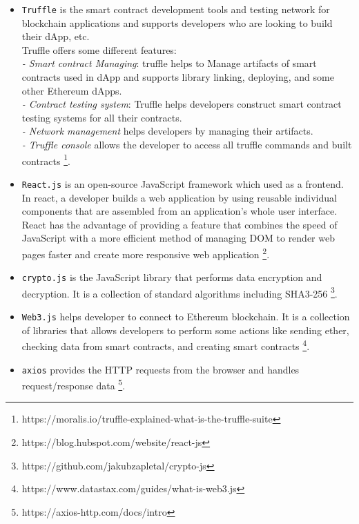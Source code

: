 \begin{itemize}
  \item \texttt{Truffle} is the smart contract development tools and testing network for blockchain applications and supports developers who are looking to build their dApp, etc. \\
 Truffle offers some different features: \\
 \textit{- Smart contract Managing}: truffle helps to Manage artifacts of smart contracts used in dApp and supports library linking, deploying, and some other Ethereum dApps. \\
 \hspace{3cm} \textit{- Contract testing system}: Truffle helps developers construct smart contract testing systems for all their contracts. \\
 \textit{- Network management} helps developers by managing their artifacts. \\
 \textit{- Truffle console} allows the developer to access all truffle commands and built contracts \footnote{https://moralis.io/truffle-explained-what-is-the-truffle-suite}.
\\
\item \texttt{React.js} is an open-source JavaScript framework which used as a frontend. In react, a developer builds a web application by using reusable individual components that are assembled from an application's whole user interface.\\
React has the advantage of providing a feature that combines the speed of JavaScript with a more efficient method of managing DOM to render web pages faster and create more responsive web application \footnote{https://blog.hubspot.com/website/react-js}.\\
\item \texttt{crypto.js} is the JavaScript library that performs data encryption and decryption. It is a collection of standard algorithms including SHA3-256 \footnote{{https://github.com/jakubzapletal/crypto-js}}.
\item \texttt{Web3.js} helps developer to connect to Ethereum blockchain. It is a collection of libraries that allows developers to perform some actions like sending ether, checking data from smart contracts, and creating smart contracts \footnote{https://www.datastax.com/guides/what-is-web3.js}.\\
\item \texttt{axios} provides the HTTP requests from the browser and handles request/response data \footnote{https://axios-http.com/docs/intro}. \\

\end{itemize}
